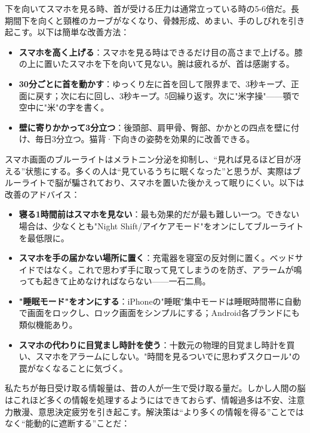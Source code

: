 
下を向いてスマホを見る時、首が受ける圧力は通常立っている時の5-6倍だ。長期間下を向くと頸椎のカーブがなくなり、骨棘形成、めまい、手のしびれを引き起こす。以下は簡単な改善方法：

\begin{itemize}
  \item \textbf{スマホを高く上げる}：スマホを見る時はできるだけ目の高さまで上げる。膝の上に置いたスマホを下を向いて見ない。腕は疲れるが、首は感謝する。
  \item \textbf{30分ごとに首を動かす}：ゆっくり左に首を回して限界まで、3秒キープ、正面に戻す；次に右に回し、3秒キープ。5回繰り返す。次に"米字操"——顎で空中に"米"の字を書く。
  \item \textbf{壁に寄りかかって3分立つ}：後頭部、肩甲骨、臀部、かかとの四点を壁に付け、毎日3分立つ。猫背·下向きの姿勢を効果的に改善できる。
\end{itemize}


スマホ画面のブルーライトはメラトニン分泌を抑制し、“見れば見るほど目が冴える”状態にする。多くの人は“見ているうちに眠くなった”と思うが、実際はブルーライトで脳が騙されており、スマホを置いた後かえって眠りにくい。以下は改善のアドバイス：

\begin{itemize}
  \item \textbf{寝る1時間前はスマホを見ない}：最も効果的だが最も難しい一つ。できない場合は、少なくとも"Night Shift/アイケアモード"をオンにしてブルーライトを最低限に。
  \item \textbf{スマホを手の届かない場所に置く}：充電器を寝室の反対側に置く。ベッドサイドではなく。これで思わず手に取って見てしまうのを防ぎ、アラームが鳴っても起きて止めなければならない——一石二鳥。
  \item \textbf{"睡眠モード"をオンにする}：iPhoneの"睡眠"集中モードは睡眠時間帯に自動で画面をロックし、ロック画面をシンプルにする；Android各ブランドにも類似機能あり。
  \item \textbf{スマホの代わりに目覚まし時計を使う}：十数元の物理的目覚まし時計を買い、スマホをアラームにしない。"時間を見るついでに思わずスクロール"の罠がなくなることに気づく。
\end{itemize}


私たちが毎日受け取る情報量は、昔の人が一生で受け取る量だ。しかし人間の脳はこれほど多くの情報を処理するようにはできておらず、情報過多は不安、注意力散漫、意思決定疲労を引き起こす。解決策は“より多くの情報を得る”ことではなく“能動的に遮断する”ことだ：

